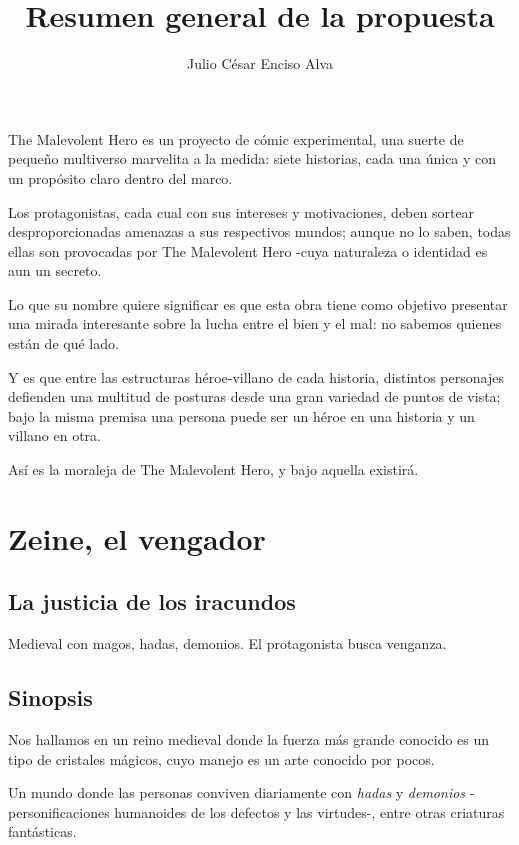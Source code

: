 \documentclass[letterpaper,12pt]{article}
\title{Resumen general de la propuesta}
\author{Julio César Enciso Alva}
\begin{document}
	
	\maketitle
	
	The Malevolent Hero es un proyecto de cómic experimental, una suerte de pequeño
	multiverso marvelita a la medida: siete historias, cada una única y con un propósito claro
	dentro del marco.
	
	Los protagonistas, cada cual con sus intereses y motivaciones, deben sortear desproporcionadas
	amenazas a sus
	respectivos mundos; aunque no lo saben, todas ellas son provocadas por The Malevolent Hero
	-cuya naturaleza o identidad es aun un secreto.
	
	Lo que su nombre quiere significar es que esta obra tiene como objetivo presentar una 
	mirada interesante sobre la lucha entre el bien y el mal: no sabemos quienes están de qué lado.
	
	Y es que entre las estructuras héroe-villano de cada historia, distintos personajes defienden
	una multitud de posturas desde una gran variedad de puntos de vista; bajo la misma 
	premisa una persona puede ser un héroe en una historia y un villano en otra.
	
	Así es la moraleja de The Malevolent Hero, y bajo aquella existirá.
	
	\newpage
	
	\section*{Zeine, el vengador}
	
	\subsection*{La justicia de los iracundos}
	
	Medieval con magos, hadas, demonios. El protagonista busca venganza.
	
	\subsection*{Sinopsis}
	
	Nos hallamos en un reino medieval donde la fuerza más grande conocido es un tipo de cristales mágicos, cuyo
	manejo es un arte conocido por pocos.
	
	Un mundo donde las personas conviven diariamente con \textit{hadas} y \textit{demonios}
	-personificaciones humanoides de los defectos y las virtudes-, entre otras criaturas fantásticas. 
	
\end{document}
